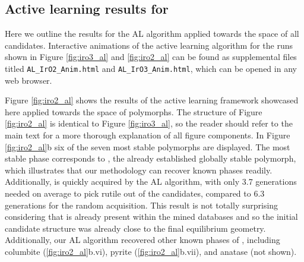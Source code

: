 \subsection{Active learning results for \IrOtwo}

%
%
Here we outline the results for the AL algorithm applied towards the space of all \IrOtwo candidates.
%
Interactive animations of the active learning algorithm for the runs shown in Figure \ref{fig:iro3_al} and \ref{fig:iro2_al} can be found as supplemental files titled
\texttt{AL\_IrO2\_Anim.html}
and
\texttt{AL\_IrO3\_Anim.html},
which can be opened in any web browser.


%
Figure \ref{fig:iro2_al} shows the results of the active learning framework showcased here applied towards the space of \IrOtwo polymorphs.
%
The structure of Figure \ref{fig:iro2_al} is identical to Figure \ref{fig:iro3_al},
so the reader should refer to the main text for a more thorough explanation of all figure components.
%
In Figure \ref{fig:iro2_al}b six of the seven most stable \IrOtwo polymorphs are displayed.
%
The most stable phase corresponds to \rIrOtwo, the already established globally stable \IrOtwo polymorph,
which illustrates that our methodology can recover known phases readily.
%
Additionally, \rIrOtwo is quickly acquired by the AL algorithm,
with only \num{3.7} generations needed on average to pick rutile out of the candidates,
compared to 6.3 generations for the random acquisition.
%
This result is not totally surprising considering that \rIrOtwo is already present within the mined databases and so the initial candidate structure was already close to the final equilibrium geometry.
%
Additionally, our AL algorithm recovered other known phases of \IrOtwo, including columbite (\ref{fig:iro2_al}b.vi), pyrite (\ref{fig:iro2_al}b.vii), and anatase (not shown).


